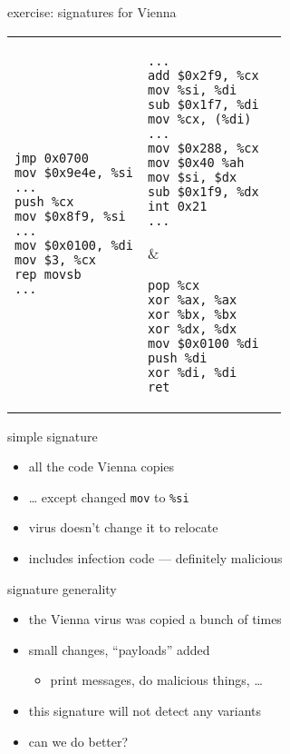 \begin{frame}[fragile,label=viennaSigs]{exercise: signatures for Vienna}
\lstset{language=myasm,style=small}
\begin{tabular}{lll}
\begin{lstlisting}
jmp 0x0700
mov $0x9e4e, %si
...
push %cx
mov $0x8f9, %si
...
mov $0x0100, %di
mov $3, %cx
rep movsb
...
\end{lstlisting}
&
\begin{lstlisting}
...
add $0x2f9, %cx
mov %si, %di
sub $0x1f7, %di
mov %cx, (%di)
...
mov $0x288, %cx
mov $0x40 %ah
mov $si, $dx
sub $0x1f9, %dx
int 0x21
...
\end{lstlisting}
&
\begin{lstlisting}
pop %cx
xor %ax, %ax
xor %bx, %bx
xor %dx, %dx
mov $0x0100 %di
push %di
xor %di, %di
ret
\end{lstlisting}
\\
\end{tabular}
\end{frame}

\begin{frame}{simple signature}
    \begin{itemize}
    \item all the code Vienna copies
    \item \ldots{} except changed {\tt mov} to {\tt \%si}
    \vspace{.5cm}
    \item virus doesn't change it to relocate
    \item includes infection code --- definitely malicious
    \end{itemize}
\end{frame}

\begin{frame}{signature generality}
    \begin{itemize}
    \item the Vienna virus was copied a bunch of times
    \item small changes, ``payloads'' added
        \begin{itemize}
        \item print messages, do malicious things, \ldots
        \end{itemize}
    \item this signature will not detect any variants
    \item can we do better?
    \end{itemize}
\end{frame}

